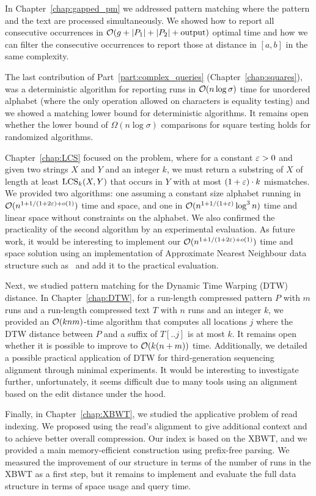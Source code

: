 In Chapter~\ref{chap:gapped_pm} we addressed pattern matching where the pattern and the text are processed simultaneously. We showed how to report all consecutive occurrences in $\mathcal{O}(g+|P_1|+|P_2|+\mathrm{output})$ optimal time and how we can filter the consecutive occurrences to report those at distance in $[a,b]$ in the same complexity.

The last contribution of Part~\ref{part:complex_queries} (Chapter~\ref{chap:squares}), was a deterministic algorithm for reporting runs in $\mathcal{O}(n\log\sigma)$ time for unordered alphabet (where the only operation allowed on characters is equality testing) and we showed a matching lower bound for deterministic algorithms. It remains open whether the lower bound of $\Omega(n\log \sigma)$ comparisons for square testing holds for randomized algorithms.

Chapter~\ref{chap:LCS} focused on the \kApproxLCS problem, where for a constant $\varepsilon > 0$ and given two strings $X$ and $Y$ and an integer $k$, we must return a substring of $X$ of length at least $\mathrm{LCS}_{k}(X,Y)$ that occurs in $Y$ with at most $(1+\varepsilon) \cdot k$ mismatches. We provided two algorithms: one assuming a constant size alphabet running in $\mathcal{O}(n^{1+ 1/(1+2\varepsilon) + o(1)})$ time and space, and one in $\mathcal{O}(n^{1+1/(1+\varepsilon)} \log^3 n)$ time and linear space without constraints on the alphabet.  We also confirmed the practicality of the second algorithm by an experimental evaluation.
As future work, it would be interesting to implement our $\mathcal{O}(n^{1+ 1/(1+2\varepsilon) + o(1)})$ time and space solution using an implementation of Approximate Nearest Neighbour data structure such as~\cite{spotify_annoy} and add it to the practical evaluation.

Next, we studied pattern matching for the Dynamic Time Warping (DTW) distance. In Chapter~\ref{chap:DTW}, for a run-length compressed pattern $P$ with $m$ runs and a run-length compressed text $T$ with $n$ runs and an integer $k$, we provided an $\mathcal{O}(knm)$-time algorithm that computes all locations $j$ where the DTW distance between $P$ and a suffix of $T[..j]$ is at most $k$. It remains open whether it is possible to improve to $\mathcal{O}(k(n+m))$ time. Additionally, we detailed a possible practical application of DTW for third-generation sequencing alignment through minimal experiments. It
would be interesting to investigate further, unfortunately, it seems difficult due to many tools using an alignment based on the edit distance under the hood.    

Finally, in Chapter~\ref{chap:XBWT}, we studied the applicative problem of read indexing. We proposed using the read's alignment to give additional context and to achieve better overall compression. Our index is based on the XBWT, and we provided a main memory-efficient construction using prefix-free parsing. We measured the improvement of our structure in terms of the number of runs in the XBWT as a first step, but it remains to implement and evaluate the full data structure in terms of space usage and query time.\\


